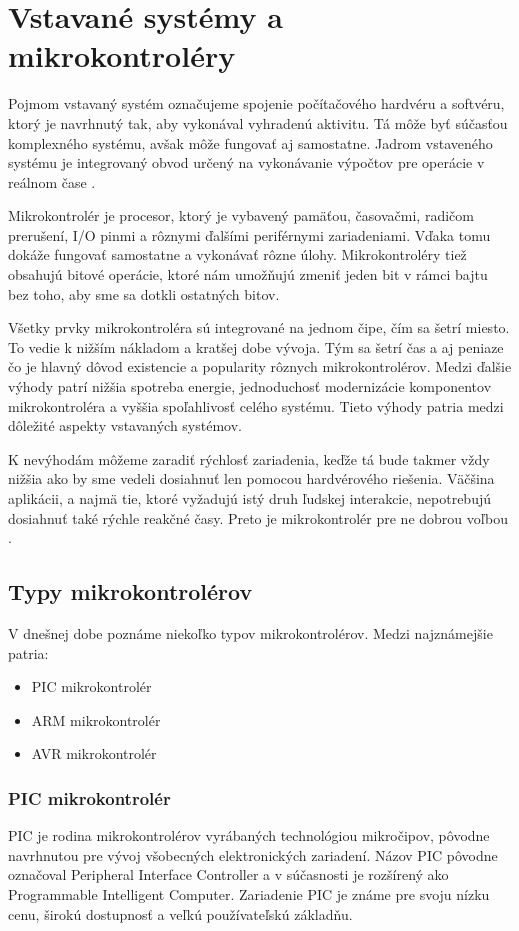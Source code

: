 \section{Vstavané systémy a mikrokontroléry}
\noindent
Pojmom vstavaný systém označujeme spojenie počítačového hardvéru a softvéru, ktorý je navrhnutý tak, aby vykonával vyhradenú aktivitu. Tá môže byť súčasťou komplexného systému, avšak môže fungovať aj samostatne. Jadrom vstaveného systému
je integrovaný obvod určený na vykonávanie výpočtov pre operácie v reálnom čase \cite{WhatEmbeddedSystem}. \par
Mikrokontrolér je procesor, ktorý je vybavený pamäťou, časovačmi, radičom prerušení, I/O pinmi a rôznymi ďalšími periférnymi
zariadeniami. Vďaka tomu dokáže fungovať samostatne a vykonávať rôzne úlohy. Mikrokontroléry tiež obsahujú bitové operácie, ktoré nám umožňujú zmeniť jeden bit v rámci bajtu bez toho, aby sme sa dotkli ostatných bitov. \par
Všetky prvky mikrokontroléra sú integrované na jednom čipe, čím sa šetrí miesto.
To vedie k nižším nákladom a kratšej dobe vývoja. Tým sa šetrí čas a aj peniaze čo je hlavný
dôvod existencie a popularity rôznych mikrokontrolérov. Medzi ďalšie výhody patrí nižšia spotreba energie,
jednoduchosť modernizácie komponentov mikrokontroléra a vyššia spoľahlivosť
celého systému. Tieto výhody patria medzi dôležité aspekty vstavaných systémov. \par
K nevýhodám môžeme zaradiť rýchlosť zariadenia, keďže tá bude takmer vždy
nižšia ako by sme vedeli dosiahnuť len pomocou hardvérového riešenia. Väčšina aplikácii, a najmä tie, ktoré vyžadujú istý druh ľudskej interakcie, nepotrebujú
dosiahnuť také rýchle reakčné časy. Preto je mikrokontrolér pre ne dobrou voľbou
\cite{guntherIntroductionMicrocontrollers2007}.

\subsection{Typy mikrokontrolérov}
\noindent
V dnešnej dobe poznáme niekoľko typov mikrokontrolérov. Medzi najznámejšie patria:
\begin{itemize}
    \item PIC mikrokontrolér
    \item ARM mikrokontrolér
    \item AVR mikrokontrolér
\end{itemize}

\subsubsection{PIC mikrokontrolér}
\noindent
PIC je rodina mikrokontrolérov vyrábaných technológiou mikročipov, pôvodne navrhnutou pre vývoj všobecných elektronických zariadení.
Názov PIC pôvodne označoval Peripheral Interface Controller a v súčasnosti je
rozšírený ako Programmable Intelligent Computer. Zariadenie PIC je známe pre
svoju nízku cenu, širokú dostupnosť a veľkú používateľskú základňu. \par

